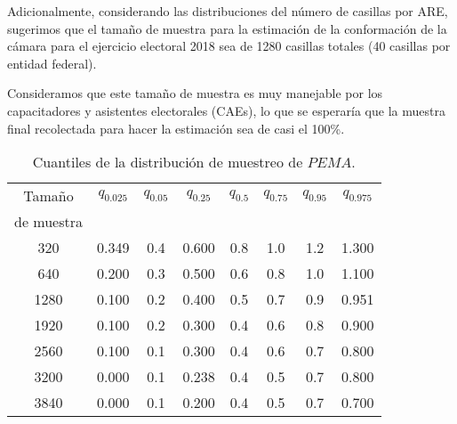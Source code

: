 \documentclass[]{article}
\begin{document}
Adicionalmente, considerando las distribuciones del número de casillas por ARE, sugerimos que el tamaño de muestra para la estimación de la conformación de la cámara para el ejercicio electoral 2018 sea de 1280 casillas totales (40 casillas por entidad federal). 

Consideramos que este tamaño de muestra es muy manejable por los capacitadores y asistentes electorales (CAEs), lo que se esperaría que la muestra final recolectada para hacer la estimación sea de casi el 100\%. 

\bigskip 

%
%
%
%
%
%
%



\begin{table}[ht]
\centering
\begin{tabular}{cccccccc}
\toprule
Tamaño & $q_{0.025}$ & $q_{0.05}$ & $q_{0.25}$ & $q_{0.5}$ & $q_{0.75}$ & $q_{0.95}$ & $q_{0.975}$\\
de muestra & \\
\midrule
320 & 0.349 & 0.4 & 0.600 & 0.8 & 1.0 & 1.2 & 1.300\\

640 & 0.200 & 0.3 & 0.500 & 0.6 & 0.8 & 1.0 & 1.100\\

1280 & 0.100 & 0.2 & 0.400 & 0.5 & 0.7 & 0.9 & 0.951\\

1920 & 0.100 & 0.2 & 0.300 & 0.4 & 0.6 & 0.8 & 0.900\\

2560 & 0.100 & 0.1 & 0.300 & 0.4 & 0.6 & 0.7 & 0.800\\

3200 & 0.000 & 0.1 & 0.238 & 0.4 & 0.5 & 0.7 & 0.800\\

3840 & 0.000 & 0.1 & 0.200 & 0.4 & 0.5 & 0.7 & 0.700\\

\bottomrule
\end{tabular}
\caption{Cuantiles de la distribución de muestreo de $PEMA$.}
\label{tab:cuantiles_pema}
\end{table}
\end{document}
